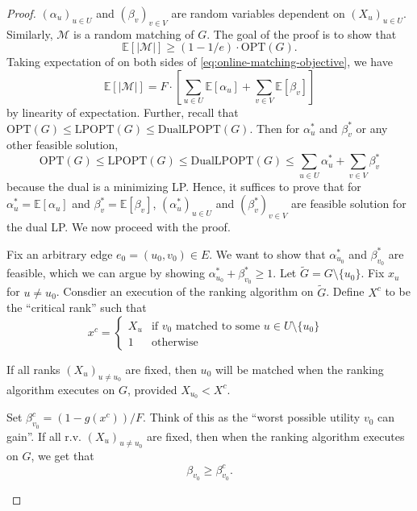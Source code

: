 \begin{proof}
    $(\alpha_u)_{u \in U}$ and $(\beta_v)_{v \in V}$ are random variables dependent on $(X_u)_{u \in U}$. Similarly, $\mathcal{M}$ is a random matching of $G$. The goal of the proof is to show that
    $$
    \mathbb{E}[|\mathcal{M}|] \geq (1-1/e) \cdot \mathrm{OPT}(G).
    $$
    Taking expectation of on both sides of \ref{eq:online-matching-objective}, we have
    $$
    \mathbb{E}[|\mathcal{M}|] = F \cdot \left[ \sum_{u \in U} \mathbb{E}[\alpha_u] + \sum_{v \in V} \mathbb{E}[\beta_v] \right]
    $$
    by linearity of expectation. Further, recall that $\mathrm{OPT}(G) \leq \mathrm{LPOPT}(G) \leq \mathrm{DualLPOPT}(G)$. Then for $\alpha_u^*$ and $\beta_v^*$ or any other feasible solution, 
    $$
    \mathrm{OPT}(G) \leq \mathrm{LPOPT}(G) \leq \mathrm{DualLPOPT}(G) \leq \sum_{u \in U} \alpha_u^* + \sum_{v \in V}\beta_v^*
    $$
    because the dual is a minimizing LP. Hence, it suffices to prove that for $\alpha_u^* = \mathbb{E}[\alpha_u]$ and $\beta_v^* = \mathbb{E}[\beta_v]$, $(\alpha_u^*)_{u \in U}$ and $(\beta_v^*)_{v \in V}$ are feasible solution for the dual LP. We now proceed with the proof.

    Fix an arbitrary edge $e_0 = (u_0,v_0) \in E$. We want to show that $\alpha_{u_0}^*$ and $\beta_{v_0}^*$ are feasible, which we can argue by showing $\alpha_{u_0}^* + \beta_{v_0}^* \geq 1$. Let $\tilde{G} = G \setminus \{u_0\}$. Fix $x_u$ for $u \neq u_0$. Consdier an execution of the ranking algorithm on $\tilde{G}$. Define $X^c$ to be the ``critical rank'' such that
    $$
    x^c = \begin{cases}
        X_u & \text{if $v_0$ matched to some $u \in U \setminus \{u_0\}$ } \\
        1 & \text{otherwise}
    \end{cases}
    $$

    \begin{lemma}
        If all ranks $(X_u)_{u \neq u_0}$ are fixed, then $u_0$ will be matched when the ranking algorithm executes on $G$, provided $X_{u_0} < X^c$.
    \end{lemma}

    \begin{lemma}
        Set $\beta_{v_0}^c = (1-g(x^c)) / F$. Think of this as the ``worst possible utility $v_0$ can gain''. If all r.v. $(X_u)_{u \neq u_0}$ are fixed, then when the ranking algorithm executes on $G$, we get that
        $$
        \beta_{v_0} \geq \beta_{v_0}^c.
        $$
    \end{lemma}


\end{proof}
